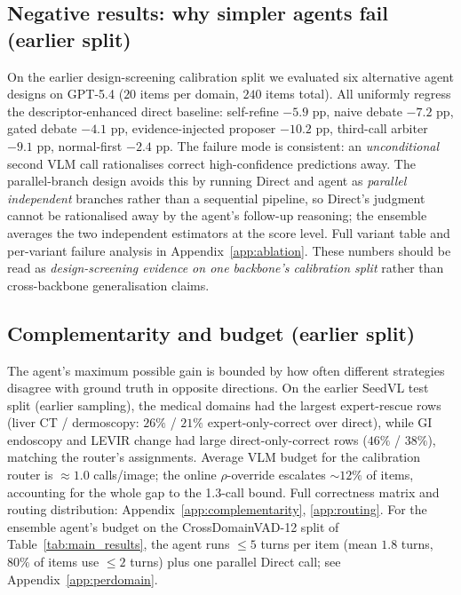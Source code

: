 \subsection{Negative results: why simpler agents fail (earlier split)}
\label{ssec:ablation}

On the earlier design-screening calibration split we evaluated six alternative agent designs on GPT-5.4 ($20$ items per domain, $240$ items total). All uniformly regress the descriptor-enhanced direct baseline: self-refine $-5.9$ pp, naive debate $-7.2$ pp, gated debate $-4.1$ pp, evidence-injected proposer $-10.2$ pp, third-call arbiter $-9.1$ pp, normal-first $-2.4$ pp. The failure mode is consistent: an \emph{unconditional} second VLM call rationalises correct high-confidence predictions away. The parallel-branch design avoids this by running Direct and agent as \emph{parallel independent} branches rather than a sequential pipeline, so Direct's judgment cannot be rationalised away by the agent's follow-up reasoning; the ensemble averages the two independent estimators at the score level. Full variant table and per-variant failure analysis in Appendix~\ref{app:ablation}. These numbers should be read as \emph{design-screening evidence on one backbone's calibration split} rather than cross-backbone generalisation claims.

\subsection{Complementarity and budget (earlier split)}
\label{ssec:complementarity}
The agent's maximum possible gain is bounded by how often different strategies disagree with ground truth in opposite directions. On the earlier SeedVL test split (earlier sampling), the medical domains had the largest expert-rescue rows (liver CT / dermoscopy: $26\%$ / $21\%$ expert-only-correct over direct), while GI endoscopy and LEVIR change had large direct-only-correct rows ($46\%$ / $38\%$), matching the router's assignments. Average VLM budget for the calibration router is $\approx 1.0$ calls/image; the online $\rho$-override escalates $\sim 12\%$ of items, accounting for the whole gap to the 1.3-call bound. Full correctness matrix and routing distribution: Appendix~\ref{app:complementarity}, \ref{app:routing}. For the ensemble agent's budget on the CrossDomainVAD-12 split of Table~\ref{tab:main_results}, the agent runs $\le 5$ turns per item (mean $1.8$ turns, $80\%$ of items use $\le 2$ turns) plus one parallel Direct call; see Appendix~\ref{app:perdomain}.

